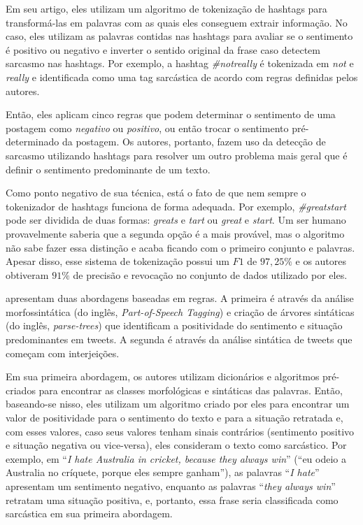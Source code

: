 Em seu artigo, eles utilizam um algoritmo de tokenização de hashtags para
transformá-las em palavras com as quais eles conseguem extrair informação. No
caso, eles utilizam as palavras contidas nas hashtags para avaliar se o
sentimento é positivo ou negativo e inverter o sentido original da frase caso
detectem sarcasmo nas hashtags. Por exemplo, a hashtag \textit{\#notreally} é
tokenizada em \textit{not} e \textit{really} e identificada como uma tag
sarcástica de acordo com regras definidas pelos autores.

Então, eles aplicam cinco regras que podem determinar o sentimento de uma
postagem como \textit{negativo} ou \textit{positivo}, ou então trocar o
sentimento pré-determinado da postagem. Os autores, portanto, fazem uso da
detecção de sarcasmo utilizando hashtags para resolver um outro problema mais
geral que é definir o sentimento predominante de um texto.

Como ponto negativo de sua técnica, está o fato de que nem sempre o tokenizador
de hashtags funciona de forma adequada. Por exemplo, \textit{\#greatstart} pode
ser dividida de duas formas: \textit{greats} e \textit{tart} ou \textit{great}
e \textit{start}. Um ser humano provavelmente saberia que a segunda opção é a
mais provável, mas o algoritmo não sabe fazer essa distinção e acaba ficando com
o primeiro conjunto e palavras. Apesar disso, esse sistema de tokenização possui
um $F1$ de $97,25\%$ e os autores obtiveram $91\%$ de precisão e revocação no
conjunto de dados utilizado por eles.

\cite{bharti-etal:2015:parsing-sarcasm} apresentam duas abordagens baseadas em
regras. A primeira é através da análise morfossintática (do inglês,
\textit{Part-of-Speech Tagging}) e criação de árvores sintáticas (do inglês,
\textit{parse-trees}) que identificam a positividade do sentimento e situação
predominantes em tweets. A segunda é através da análise sintática de tweets que
começam com interjeições.

Em sua primeira abordagem, os autores utilizam dicionários e algoritmos
pré-criados para encontrar as classes morfológicas e sintáticas das palavras.
Então, baseando-se nisso, eles utilizam um algoritmo criado por eles para
encontrar um valor de positividade para o sentimento do texto e para a situação
retratada e, com esses valores, caso seus valores tenham sinais contrários
(sentimento positivo e situação negativa ou vice-versa), eles consideram o texto
como sarcástico. Por exemplo, em ``\textit{I hate Australia in cricket, because
they always win}'' (``eu odeio a Australia no críquete, porque eles sempre
ganham''), as palavras ``\textit{I hate}'' apresentam um sentimento negativo,
enquanto as palavras ``\textit{they always win}'' retratam uma situação
positiva, e, portanto, essa frase seria classificada como sarcástica em sua
primeira abordagem.


